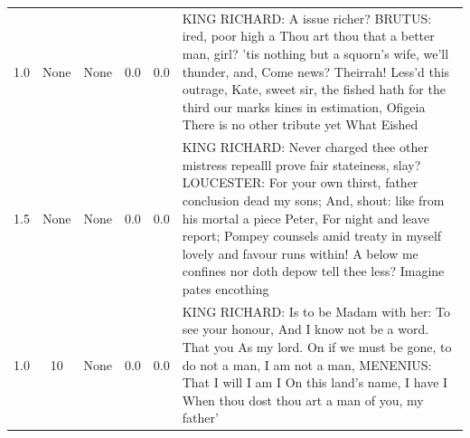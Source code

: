 \documentclass[11pt]{book}
\begin{document}
\begin{longtable}{ccccc p{12cm}}
    1.0 & None & None & 0.0 & 0.0 &
    KING RICHARD:\newline
    A issue richer?\newline
    BRUTUS:\newline
    ired, poor high a\newline
    Thou art thou that a better man, girl?\newline
    'tis nothing but a squorn's wife, we'll thunder, and,\newline
    Come news?\newline
    Theirrah!\newline
    Less'd this outrage, Kate, sweet sir, the fished hath for the third our marks kines in estimation,\newline
    Ofigeia\newline
    There is no other tribute yet\newline
    What Eished\\
    
    1.5 & None & None & 0.0 & 0.0 &
    KING RICHARD:\newline
    Never charged thee other mistress repealll prove fair stateiness, slay?\newline
    LOUCESTER:\newline
    For your own thirst, father conclusion dead my sons;\newline
    And, shout: like from his mortal a piece Peter,\newline
    For night and leave report;\newline
    Pompey counsels amid treaty in myself lovely and favour runs within!\newline
    A below me confines nor doth depow tell thee less?\newline
    Imagine pates encothing\\
    
    1.0 & 10 & None & 0.0 & 0.0 &
    KING RICHARD:\newline
    Is to be\newline
    Madam with her:\newline
    To see your honour,\newline
    And I know not be a word.\newline
    That you\newline
    As my lord.\newline
    On if we must be gone, to do not a man, I am not a man,\newline
    MENENIUS:\newline
    That I will I am I\newline
    On this land's name,\newline
    I have I\newline
    When thou dost thou art a man of you, my father'\\
    

\end{longtable}
\end{document}
